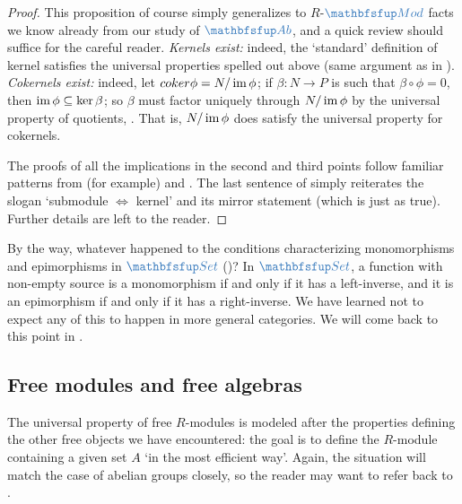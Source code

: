 \begin{proof}
  This proposition of course simply generalizes to $R$-$\categ{Mod}$
  facts we know already from our study of $\categ{Ab}$, and a quick
  review should suffice for the careful reader. \emph{Kernels exist:}
  indeed, the `standard' definition of kernel satisfies the universal
  properties spelled out above (same argument as in
  ). \emph{Cokernels
    exist:} indeed, let $coker\phi = N / \operatorname{im}\phi$; if
  $\beta : N \to P$ is such that $\beta \circ \phi = 0$, then
  $\operatorname{im}\phi \subseteq \ker\beta$; so $\beta$ must factor uniquely
  through $N/\operatorname{im}\phi$ by the universal property of quotients,
  . That is, $N/\operatorname{im}\phi$
  does satisfy the universal property for cokernels.

  The proofs of all the implications in the second and third points
  follow familiar patterns from (for example)
   and
  . The last sentence
  of  simply reiterates the slogan
  `submodule $\iff$ kernel' and its mirror statement (which is just as
  true). Further details are left to the reader.
\end{proof}
By the way, whatever happened to the conditions characterizing
monomorphisms and epimorphisms in $\categ{Set}$
()?  In $\categ{Set}$, a function with
non-empty source is a monomorphism if and only if it has a
left-inverse, and it is an epimorphism if and only if it has a
right-inverse. We have learned not to expect any of this to happen in
more general categories.  We will come back to this point in
.

\subsection{Free modules and free algebras}
\label{subsec:rings:free-modules-and-free-algebras}
The universal property of free $R$-modules is modeled after the
properties defining the other free objects we have encountered: the
goal is to define the $R$-module containing a given set $A$ `in the
most efficient way'. Again, the situation will match the case of
abelian groups closely, so the reader may want to refer back to
.

